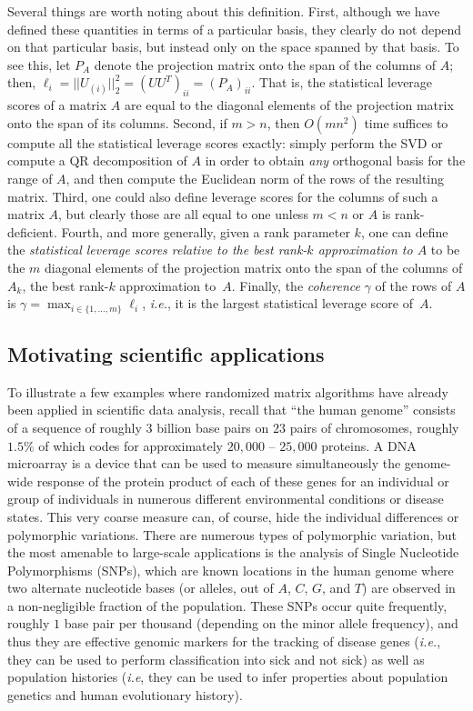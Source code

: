 \documentclass[twoside]{article}
\begin{document}
\noindent 
Several things are worth noting about this definition.
First, although we have defined these quantities in terms of a particular 
basis, they clearly do not depend on that particular basis, but instead 
only on the space spanned by that basis. 
To see this, let $P_A$ denote the projection matrix onto the span of the 
columns of $A$; then,
$\ell_i = ||U_{(i)}||_2^2 = \left(UU^T\right)_{ii} = \left(P_A\right)_{ii}$.
That is, the statistical leverage scores of a matrix $A$ are equal to the
diagonal elements of the projection matrix onto the span of its columns.
Second, if $m > n$, then $O(mn^2)$ time suffices to compute all the 
statistical leverage scores exactly: simply perform the SVD or compute a QR 
decomposition of $A$ in order to obtain \emph{any} orthogonal basis for the 
range of $A$, and then compute the Euclidean norm of the rows of the 
resulting matrix.
Third, one could also define leverage scores for the columns of such a 
matrix $A$, but clearly those are all equal to one unless $m<n$ or $A$ is
rank-deficient. 
Fourth, and more generally, given a rank parameter $k$, one can define the
\emph{statistical leverage scores relative to the best rank-$k$
approximation to $A$} to be the $m$ diagonal
elements of the projection matrix onto the span of the columns of $A_k$, the 
best rank-$k$ approximation to~$A$.
Finally, the \emph{coherence} $\gamma$ of the rows of $A$ is
$\gamma = \max_{i\in\{1,\ldots,m\}} \ell_i $, \emph{i.e.}, it is the largest 
statistical leverage score of~$A$.


\subsection{Motivating scientific applications}
\label{sxn:background1:genetics}

To illustrate a few examples where randomized matrix algorithms have already
been applied in scientific data analysis,
recall that ``the human genome'' consists of a sequence of roughly 
$3$ billion base pairs on $23$ pairs of chromosomes, roughly $1.5\%$ of 
which codes for approximately $20,000$ -- $25,000$ proteins.
A DNA microarray is a device that can be used to measure simultaneously the 
genome-wide response of the protein product of each of these genes for an 
individual or group of individuals in numerous different environmental 
conditions or disease states.
This very coarse measure can, of course, hide the individual differences or 
polymorphic variations. 
There are numerous types of polymorphic variation, but the most amenable to 
large-scale applications is the analysis of Single Nucleotide Polymorphisms 
(SNPs), which are known locations in the human genome where two alternate 
nucleotide bases (or alleles, out of $A$, $C$, $G$, and $T$) are observed in 
a non-negligible fraction of the population.
These SNPs occur quite frequently, roughly $1$ base pair per thousand (depending on the minor allele frequency), and thus they
are effective genomic markers for the tracking of disease genes (\emph{i.e.}, 
they can be used to perform classification into sick and not sick) as well as
population histories (\emph{i.e}, they can be used to infer properties about 
population genetics and human evolutionary history).
\end{document}
